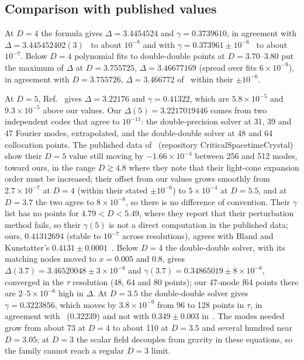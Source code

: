 \documentclass[aps,prd,onecolumn,superscriptaddress,nofootinbib,10pt]{revtex4-2}
\begin{document}
\subsection{Comparison with published values}
\label{sec:published}

At $D = 4$ the formula gives $\Delta = 3.4454524$ and $\gamma = 0.3739610$, in agreement with
$\Delta = 3.445452402(3)$~\cite{MartinGarciaGundlach2003} to about $10^{-8}$ and with
$\gamma = 0.373961 \pm 10^{-6}$~\cite{EckerEtAl2026} to about $10^{-7}$. Below $D = 4$ polynomial fits to double-double
points at $D = 3.70$--$3.80$ put the maximum of $\Delta$ at $D = 3.755725$, $\Delta = 3.46677169$ (spread over fits
$6\times10^{-9}$), in agreement with $D = 3.755726$, $\Delta = 3.466772$ of~\cite{EckerEtAl2026} within their $\pm10^{-6}$.

At $D = 5$, Ref.~\cite{EckerEtAl2026} gives $\Delta = 3.22176$ and $\gamma = 0.41322$, which are $5.8\times10^{-5}$ and
$9.3\times10^{-5}$ above our values. Our $\Delta(5) = 3.2217019446$ comes from two independent codes that agree to
$10^{-11}$: the double-precision solver at 31, 39 and 47 Fourier modes, extrapolated, and the double-double solver at 48
and 64 collocation points. The published data of~\cite{EckerEtAl2026} (repository CriticalSpacetimeCrystal) show their $D = 5$ value
still moving by $-1.66\times10^{-4}$ between 256 and 512 modes, toward ours, in the range $D \gtrsim 4.8$ where they
note that their light-cone expansion order must be increased; their offset from our values grows smoothly from
$2.7\times10^{-7}$ at $D = 4$ (within their stated $\pm10^{-6}$) to $5\times10^{-4}$ at $D = 5.5$, and at $D = 3.7$ the two
agree to $8\times10^{-8}$, so there is no difference of convention. Their $\gamma$ list has no points for
$4.79 < D < 5.49$, where they report that their perturbation method fails, so their $\gamma(5)$ is not a direct
computation in the published data; ours, $0.41312694$ (stable to $10^{-7}$ across resolutions), agrees with Bland and
Kunstatter's $0.4131 \pm 0.0001$~\cite{BlandKunstatter2007}. Below $D = 4$ the double-double solver, with its matching nodes moved to $x = 0.005$
and $0.8$, gives $\Delta(3.7) = 3.46520048 \pm 3\times10^{-8}$ and $\gamma(3.7) = 0.34865019 \pm 8\times10^{-8}$, converged in
the $\tau$ resolution (48, 64 and 80 points); our 47-mode f64 points there are $2$--$5\times10^{-6}$ high in $\Delta$.
At $D = 3.5$ the double-double solver gives $\gamma = 0.3223856$, which moves by $3.8\times10^{-9}$ from 96 to 128
points in $\tau$, in agreement with~\cite{EckerEtAl2026} ($0.32239$) and not with $0.349 \pm 0.003$
in~\cite{BlandEtAl2005}. The modes needed grow from about 73 at $D = 4$ to
about 110 at $D = 3.5$ and several hundred near $D = 3.05$; at $D = 3$ the scalar field decouples from gravity in these
equations, so the family cannot reach a regular $D = 3$ limit.
\end{document}
